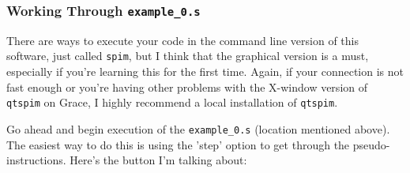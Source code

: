 \documentclass[english, 10pt]{article}
\begin{document}
\subsubsection{Working Through \texttt{example\_0.s}}

There are ways to execute your code in the command line version of this software, just called \texttt{spim}, but I think that the graphical version is a must, especially if you're learning this for the first time. Again, if your connection is not fast enough or you're having other problems with the X-window version of \texttt{qtspim} on Grace, I highly recommend a local installation of \texttt{qtspim}.\newline

Go ahead and begin execution of the \texttt{example\_0.s} (location mentioned above). The easiest way to do this is using the 'step' option to get through the pseudo-instructions. Here's the button I'm talking about:\newline
\end{document}
